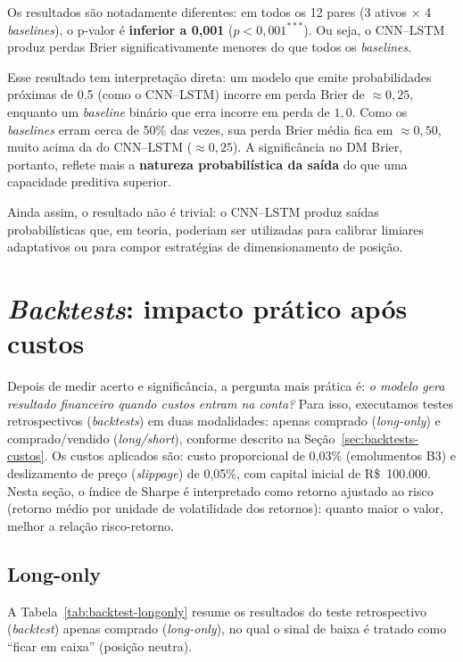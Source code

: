 Os resultados são notadamente diferentes: em todos os 12 pares (3 ativos $\times$ 4
\textit{baselines}), o p-valor é \textbf{inferior a 0,001} ($p < 0{,}001^{***}$).
Ou seja, o CNN--LSTM produz perdas Brier significativamente menores do que todos os \textit{baselines}.

Esse resultado tem interpretação direta: um modelo que emite probabilidades próximas de
0,5 (como o CNN--LSTM) incorre em perda Brier de $\approx 0{,}25$, enquanto um \textit{baseline}
binário que erra incorre em perda de $1{,}0$. Como os \textit{baselines} erram cerca de 50\% das vezes,
sua perda Brier média fica em $\approx 0{,}50$, muito acima da do CNN--LSTM ($\approx 0{,}25$).
A significância no DM Brier, portanto, reflete mais a \textbf{natureza probabilística da saída}
do que uma capacidade preditiva superior.

Ainda assim, o resultado não é trivial: o CNN--LSTM produz saídas probabilísticas que,
em teoria, poderiam ser utilizadas para calibrar limiares adaptativos ou para compor
estratégias de dimensionamento de posição.

\section{\textit{Backtests}: impacto prático após custos}
\label{sec:backtests}

Depois de medir acerto e significância, a pergunta mais prática é:
\emph{o modelo gera resultado financeiro quando custos entram na conta?}
Para isso, executamos testes retrospectivos (\textit{backtests}) em duas modalidades: apenas comprado (\textit{long-only}) e comprado/vendido (\textit{long/short}),
conforme descrito na Seção~\ref{sec:backtests-custos}. Os custos aplicados são:
custo proporcional de 0,03\% (emolumentos B3) e deslizamento de preço (\textit{slippage}) de 0,05\%,
com capital inicial de R\$~100.000.
Nesta seção, o índice de Sharpe é interpretado como retorno ajustado ao risco (retorno médio por unidade de volatilidade dos retornos): quanto maior o valor, melhor a relação risco-retorno.

\subsection{Long-only}

A Tabela~\ref{tab:backtest-longonly} resume os resultados do teste retrospectivo (\textit{backtest}) apenas comprado (\textit{long-only}),
no qual o sinal de baixa é tratado como ``ficar em caixa'' (posição neutra).

